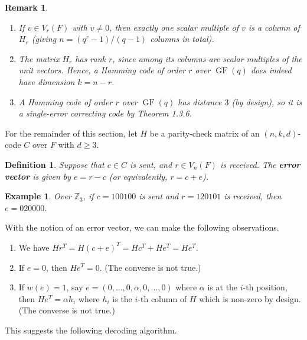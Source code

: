 \documentclass[10pt]{article}
\newcommand{\Z}{\mathbb{Z}}
\DeclareMathOperator{\GF}{GF}
\theoremstyle{newstyle}
\newtheorem{remark}[thm]{Remark}
\newtheorem{defn}[thm]{Definition}
\newtheorem{exmp}[thm]{Example}
\begin{document}
\begin{remark}~
\begin{enumerate}[(1)]
    \item If $v \in V_r(F)$ with $v \neq 0$, then exactly one scalar multiple of $v$ is a column 
    of $H_r$ (giving $n = (q^r - 1)/(q-1)$ columns in total).
    \item The matrix $H_r$ has rank $r$, since among its columns are scalar multiples of 
    the unit vectors. Hence, a Hamming code of order $r$ over $\GF(q)$ does indeed have dimension 
    $k = n-r$. 
    \item A Hamming code of order $r$ over $\GF(q)$ has distance $3$ (by design), so it is 
    a single-error correcting code by Theorem 1.3.6. 
\end{enumerate}
\end{remark}

For the remainder of this section, let $H$ be a parity-check matrix of an $(n, k, d)$-code $C$ 
over $F$ with $d \geq 3$. 

\begin{defn}
Suppose that $c \in C$ is sent, and $r \in V_n(F)$ is received. The {\bf error vector} 
is given by $e = r-c$ (or equivalently, $r = c+e$). 
\end{defn}

\begin{exmp}
Over $\Z_3$, if $c = 100100$ is sent and $r = 120101$ is received, then $e = 020000$. 
\end{exmp}

With the notion of an error vector, we can make the following observations.
\begin{enumerate}[(1)]
    \item We have $Hr^T = H(c+e)^T = Hc^T + He^T = He^T$. 
    \item If $e = 0$, then $He^T = 0$. (The converse is not true.)
    \item If $w(e) = 1$, say $e = (0, \dots, 0, \alpha, 0, \dots, 0)$ where $\alpha$ is at the 
    $i$-th position, then $He^T = \alpha h_i$ where $h_i$ is the $i$-th column of $H$ which is 
    non-zero by design. (The converse is not true.)
\end{enumerate}
This suggests the following decoding algorithm. 
\end{document}
